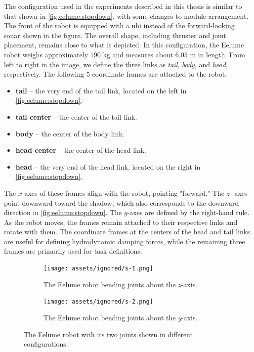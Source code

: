 The configuration used in the experiments described in this thesis is similar 
to that shown in \autoref{fig:eelume:stopdown}, with some changes to module 
arrangement. The front of the robot is equipped with a \gls{uhi} instead of 
the forward-looking sonar shown in the figure. The overall shape, including 
thruster and joint placement, remains close to what is depicted. In this 
configuration, the Eelume robot weighs approximately $190$ kg and measures 
about $6.05$ m in length. From left to right in the image, we define the three 
links as \textit{tail}, \textit{body}, and \textit{head}, respectively. The 
following $5$ coordinate frames are attached to the robot:
\begin{itemize}
\item \textbf{tail} – the very end of the tail link, located on the left in \autoref{fig:eelume:stopdown}.
\item \textbf{tail center} – the center of the tail link.
\item \textbf{body} – the center of the body link.
\item \textbf{head center} – the center of the head link.
\item \textbf{head} – the very end of the head link, located on the right in \autoref{fig:eelume:stopdown}.
\end{itemize}

The $x$-axes of these frames align with the robot, pointing "forward." The $z$-
axes point downward toward the shadow, which also corresponds to the downward 
direction in \autoref{fig:eelume:stopdown}. The $y$-axes are defined by the 
right-hand rule. As the robot moves, the frames remain attached to their 
respective links and rotate with them. The coordinate frames at the centers of 
the head and tail links are useful for defining hydrodynamic damping forces, 
while the remaining three frames are primarily used for task definitions.

\begin{figure}[h!]
    \centering
    \begin{subfigure}{0.45\textwidth}
        \centering
        \texttt{[image: assets/ignored/s-1.png]}
        \caption{The Eelume robot bending joints about the $z$-axis.}
        \label{fig:eelume:joints:1}
    \end{subfigure}
    \hfill
    \begin{subfigure}{0.45\textwidth}
        \centering
        \texttt{[image: assets/ignored/s-2.png]}
        \caption{The Eelume robot bending joints about the $y$-axis.}
        \label{fig:eelume:joints:2}
    \end{subfigure}
    \caption{The Eelume robot with its two joints shown in different configurations.}
\label{fig:eelume:joints}
\end{figure}

